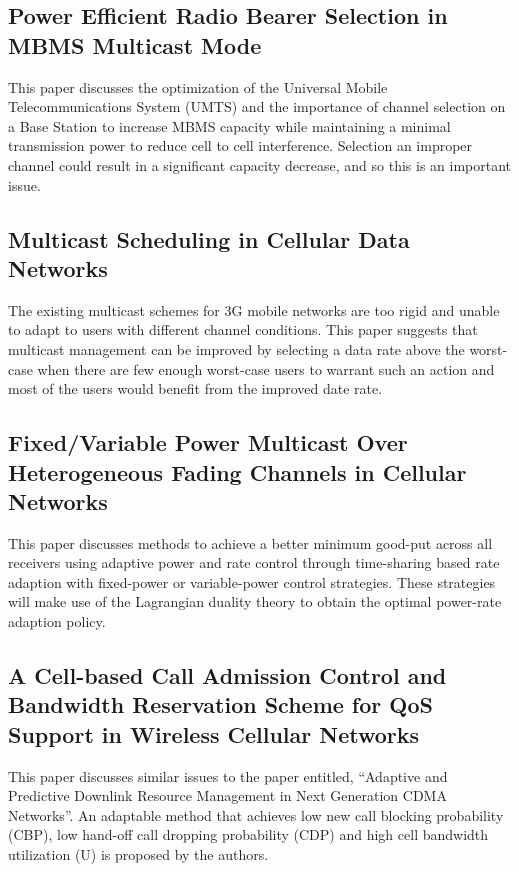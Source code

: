 \documentclass{article}
\begin{document}
\subsection{Power Efficient Radio Bearer Selection in MBMS Multicast
  Mode}

This paper discusses the optimization of the Universal Mobile
Telecommunications System (UMTS) and the importance of channel
selection on a Base Station to increase MBMS capacity while
maintaining a minimal transmission power to reduce cell to cell
interference. Selection an improper channel could result in a
significant capacity decrease, and so this is an important
issue.~\cite{alexiou2007power}

\subsection{Multicast Scheduling in Cellular Data Networks}

The existing multicast schemes for 3G mobile networks are too rigid
and unable to adapt to users with different channel conditions. This
paper suggests that multicast management can be improved by selecting
a data rate above the worst-case when there are few enough worst-case
users to warrant such an action and most of the users would benefit
from the improved date rate.~\cite{won2007multicast}

\subsection{Fixed/Variable Power Multicast Over Heterogeneous Fading
  Channels in Cellular Networks}

This paper discusses methods to achieve a better minimum good-put
across all receivers using adaptive power and rate control through
time-sharing based rate adaption with fixed-power or variable-power
control strategies. These strategies will make use of the Lagrangian
duality theory to obtain the optimal power-rate adaption
policy.~\cite{du-fixed}

\subsection{A Cell-based Call Admission Control and Bandwidth
  Reservation Scheme for QoS Support in Wireless Cellular Networks}

This paper discusses similar issues to the paper entitled, “Adaptive
and Predictive Downlink Resource Management in Next Generation CDMA
Networks”. An adaptable method that achieves low new call blocking
probability (CBP), low hand-off call dropping probability (CDP) and
high cell bandwidth utilization (U) is proposed by the
authors.~\cite{liu2005}
\end{document}
